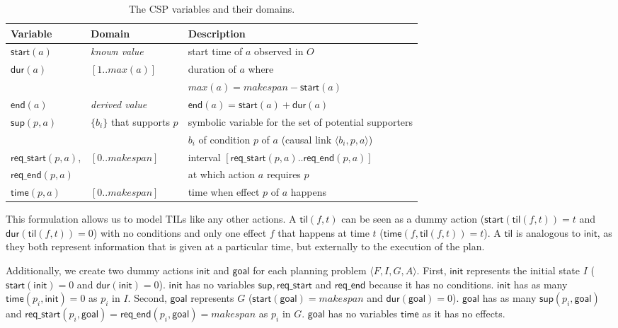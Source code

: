\documentclass{ecai}
\newcommand{\tup}[1]{{\langle #1 \rangle}}
\newcommand{\dur}{\mathsf{dur}}    %
\newcommand{\start}{\mathsf{start}}%
\newcommand{\en}{\mathsf{end}}     %
\newcommand{\til}{\mathsf{til}}    %
\newcommand{\supp}{\mathsf{sup}}   %
\newcommand{\tim}{\mathsf{time}}   %
\newcommand{\reqs}{\mathsf{req\_{start}}} %
\newcommand{\reqe}{\mathsf{req\_{end}}}   %
\newcommand{\ini}{\mathsf{init}}   %
\newcommand{\goal}{\mathsf{goal}}  %
\begin{document}
\begin{table}
\setlength\extrarowheight{3pt}  
\begin{scriptsize}
\begin{tabular}{lll}
{\bf Variable} & {\bf Domain} & {\bf Description} \\\hline

$\start(a)$ & \emph{known value} & start time of $a$ observed in $O$ \\
$\dur(a)$ & $[1..max(a)]$ & duration of $a$ where \\
&&$max(a)=makespan-\start(a)$\\
$\en(a)$ & \emph{derived value} & $\en(a)=\start(a)+\dur(a)$ \\

$\supp(p,a)$ & $\{b_i\}$ that supports $p$ & symbolic variable for the set of potential supporters\\
&& $b_i$ of condition $p$ of $a$ (causal link $\tup{b_i,p,a}$) \\

$\reqs(p,a)$, & $[0..makespan]$ & interval $[\reqs(p,a)..\reqe(p,a)]$ \\ 
$\reqe(p,a)$ && at which action $a$ requires $p$ \\


$\tim(p,a)$ & $[0..makespan]$ & time when effect $p$ of $a$ happens \\
\end{tabular}
\end{scriptsize}
\caption{\small The CSP variables and their domains.}
\label{table:variables}
\end{table}

This formulation allows us to model TILs like any other actions. A $\til(f,t)$ can be seen as a dummy action ($\start(\til(f,t))=t$ and $\dur(\til(f,t))=0$) with no conditions and only one effect $f$ that happens at time $t$ ($\tim(f,\til(f,t))=t$). A $\til$ is analogous to $\ini$, as they both represent information that is given at a particular time, but externally to the execution of the plan. 

Additionally, we create two dummy actions $\ini$ and $\goal$ for each planning problem $\tup{F,I,G,A}$. First, $\ini$ represents the initial state $I$ ($\start(\ini)=0$ and $\dur(\ini)=0$). $\ini$ has no variables $\supp, \reqs$ and $\reqe$ because it has no conditions. $\ini$ has as many $\tim(p_i,\ini)=0$ as $p_i$ in $I$. Second, $\goal$ represents $G$ ($\start(\goal)=makespan$ and $\dur(\goal)=0$). $\goal$ has as many $\supp(p_i,\goal)$ and $\reqs(p_i,\goal)=\reqe(p_i,\goal)=makespan$ as $p_i$ in $G$. $\goal$ has no variables $\tim$ as it has no effects.
\end{document}
